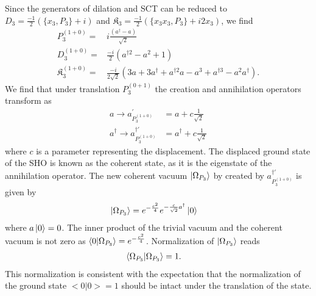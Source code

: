 \documentclass[%
 reprint,
superscriptaddress,
 amsmath,amssymb,
 aps,
]{revtex4-2}
\begin{document}
Since the generators of dilation and SCT can be reduced to $D_{3}=\frac{-1}{2}\left(\{x_{3}, P_{3}\}+i\right)$ and $\mathfrak{K}_{{3}}=\frac{-1}{2}\left(\{x_{3}x_{3}, P_{3}\}+i2x_{3}\right)$, we find
\begin{align}
    P^{(1+0)}_{3}=&i\frac{(a^{\dagger}-a)}{\sqrt{2}}\\
    D^{(1+0)}_{3}=&\frac{-i}{2}\left(a^{\dagger 2} - a^2+1\right)\\
    \mathfrak{K}^{(1+0)}_{{3}}=&\frac{-i}{2\sqrt{2}}\left(3a+3a^{\dagger}+  a^{\dagger 2}a - a^3 +  a^{\dagger 3} - a^2 a^{\dagger}\right).
\end{align}
We find that under translation $P^{(0+1)}_{3}$ the creation and annihilation operators transform as
\begin{align}
    a \rightarrow a^{\prime}_{P^{(1+0)}_{3}}&=a +c \frac{1}{\sqrt{2}}\\
    a^{\dagger} \rightarrow a^{\dagger\prime}_{P^{(1+0)}_{3}}&=a^{\dagger} +c \frac{1}{\sqrt{2}}
\end{align}
where $c$ is a parameter representing the displacement. The displaced ground state of the SHO is known as the coherent state, as it is the eigenstate of the annihilation operator\cite{Glauber1963}. The new coherent vacuum $\ket{\Omega_{P_{3}}}$ by created by $a^{\dagger\prime}_{P^{(1+0)}_{3}}$ is given by
\begin{align}
    \ket{\Omega_{P_{3}}}&=e^{-\frac{c^2}{4}}e^{-\frac{c}{\sqrt{2}}a^{\dagger}}\ket{0}
\end{align}
where $a\ket{0}=0$. The inner product of the trivial vacuum and the coherent vacuum is not zero as $\braket{0|\Omega_{P_{3}}} = 
e^{-\frac{c^2}{4}}$. Normalization of $\ket{\Omega_{P_{3}}}$ reads 
\begin{align}
\braket{\Omega_{P_{3}}|\Omega_{P_{3}}} &=1.
\end{align}
This normalization is consistent with the expectation that the normalization of the ground state $<0|0> =1$ should be intact under the translation of the state. 
\end{document}
